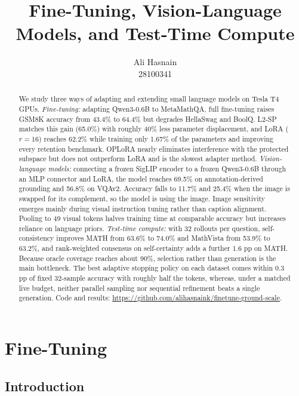 \documentclass{article}
\title{Fine-Tuning, Vision-Language Models, and Test-Time Compute}
\author{
    Ali Hasnain \\
    28100341 \\
}
\begin{document}
\maketitle
\suppressfloats[t]

\begin{abstract}
We study three ways of adapting and extending small language models on Tesla T4 GPUs. \emph{Fine-tuning:} adapting Qwen3-0.6B to MetaMathQA, full fine-tuning raises GSM8K accuracy from 43.4\% to 64.4\% but degrades HellaSwag and BoolQ. L2-SP matches this gain (65.0\%) with roughly 40\% less parameter displacement, and LoRA ($r{=}16$) reaches 62.2\% while training only 1.67\% of the parameters and improving every retention benchmark. OPLoRA nearly eliminates interference with the protected subspace but does not outperform LoRA and is the slowest adapter method. \emph{Vision-language models:} connecting a frozen SigLIP encoder to a frozen Qwen3-0.6B through an MLP connector and LoRA, the model reaches 69.5\% on annotation-derived grounding and 56.8\% on VQAv2. Accuracy falls to 11.7\% and 25.4\% when the image is swapped for its complement, so the model is using the image. Image sensitivity emerges mainly during visual instruction tuning rather than caption alignment. Pooling to 49 visual tokens halves training time at comparable accuracy but increases reliance on language priors. \emph{Test-time compute:} with 32 rollouts per question, self-consistency improves MATH from 63.6\% to 74.0\% and MathVista from 53.9\% to 63.2\%, and rank-weighted consensus on self-certainty adds a further 1.6 pp on MATH. Because oracle coverage reaches about 90\%, selection rather than generation is the main bottleneck. The best adaptive stopping policy on each dataset comes within 0.3 pp of fixed 32-sample accuracy with roughly half the tokens, whereas, under a matched live budget, neither parallel sampling nor sequential refinement beats a single generation. Code and results: \url{https://github.com/alihasnaink/finetune-ground-scale}.
\end{abstract}

\section{Fine-Tuning}
\label{sec:finetuning}

\subsection{Introduction}
\label{sec:finetuning-intro}
\end{document}
